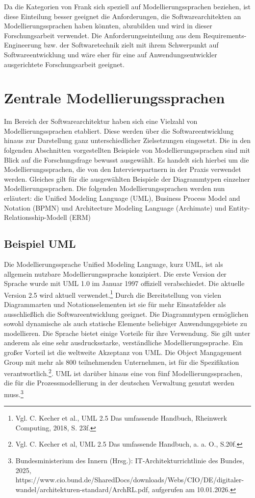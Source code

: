 Da die Kategorien von Frank sich speziell auf Modellierungssprachen beziehen, ist diese Einteilung besser geeignet die Anforderungen, die Softwarearchitekten an Modellierungssprachen haben könnten, abzubilden und wird in dieser Forschungsarbeit verwendet. Die Anforderungseinteilung aus dem Requirements-Engineerung bzw. der Softwaretechnik zielt mit ihrem Schwerpunkt auf Softwareentwicklung und wäre eher für eine auf Anwendungsentwickler ausgerichtete Forschungsarbeit geeignet. 





\section{Zentrale Modellierungssprachen}

Im Bereich der Softwarearchitektur haben sich eine Vielzahl von Modellierungssprachen etabliert. Diese werden über die Softwareentwicklung hinaus zur Darstellung ganz unterschiedlicher Zielsetzungen eingesetzt. Die in den folgenden Abschnitten vorgestellten Beispiele von Modellierungssprachen sind mit Blick auf die Forschungsfrage bewusst ausgewählt. Es handelt sich hierbei um die Modellierungssprachen, die von den Interviewpartnern in der Praxis verwendet werden. Gleiches gilt für die ausgewählten Beispiele der Diagrammtypen einzelner Modellierungssprachen. Die folgenden Modellierungssprachen werden nun erläutert: die Unified Modeling Language (UML), Business Process Model and Notation (BPMN) und Architecture Modeling Language (Archimate) und Entity-Relationsship-Modell (ERM)

 

\subsection{Beispiel UML}

Die Modellierungssprache Unified Modeling Language, kurz UML, ist als allgemein nutzbare Modellierungssprache konzipiert. Die erste Version der Sprache wurde mit UML 1.0 im Januar 1997 offiziell verabschiedet. Die aktuelle Version 2.5 wird aktuell verwendet.\footnote{Vgl. C. Kecher et al., UML 2.5 Das umfassende Handbuch, Rheinwerk Computing, 2018, S. 23f.} Durch die Bereitstellung von vielen Diagrammarten und Notationselementen ist sie für mehr Einsatzfelder als ausschließlich die Softwareentwicklung geeignet. Die Diagrammtypen ermöglichen sowohl dynamische als auch statische Elemente beliebiger Anwendungsgebiete zu modellieren. Die Sprache bietet einige Vorteile für ihre Verwendung. Sie gilt unter anderem als eine sehr ausdrucksstarke, verständliche Modellierungssprache. Ein großer Vorteil ist die weltweite Akzeptanz von UML. Die Object Mangagement Group mit mehr als 800 teilnehmenden Unternehmen, ist für die Spezifikation verantwortlich.\footnote{Vgl. C. Kecher et al, UML 2.5 Das umfassende Handbuch, a. a. O., S.20f.}. UML ist darüber hinaus eine von fünf Modellierungssprachen, die für die Prozessmodellierung in der deutschen Verwaltung genutzt werden muss.\footnote{Bundesministerium des Innern (Hrsg.): IT‑Architekturrichtlinie des Bundes, 2025, https://www.cio.bund.de/SharedDocs/downloads/Webs/CIO/DE/digitaler-wandel/architekturen-standard/ArchRL.pdf, aufgerufen am 10.01.2026.}

